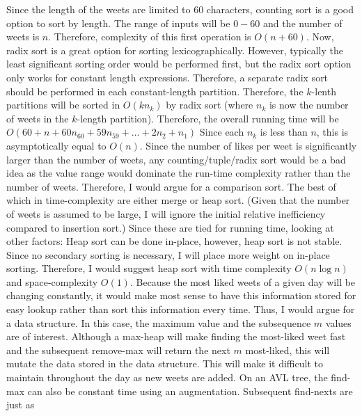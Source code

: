 \documentclass[12pt,twoside]{article}
\begin{document}
\begin{problems}
\newpage
\problem  %

\begin{problemparts}
\problempart Since the length of the weets are limited to 60 characters,
    counting sort is a good option to sort by length. The range of inputs
    will be $0 - 60$ and the number of weets is $n$. Therefore, complexity of
    this first operation is $O(n + 60)$. Now, radix sort is a great option
    for sorting lexicographically. However, typically the least significant
    sorting order would be performed first, but the radix sort option only
    works for constant length expressions. Therefore, a separate radix sort
    should be performed in each constant-length partition. Therefore, the
    $k$-lenth partitions will be sorted in $ O(kn_k) $ by radix sort (where
    $n_k$ is now the number of weets in the $k$-length partition). Therefore,
    the overall running time will be $ O(60 + n + 60n_{60} + 59 n_{59} +
    \ldots + 2 n_2 + n_1) $ Since each $n_k$ is less than $n$, this is
    asymptotically equal to $O(n)$.
\problempart Since the number of likes per weet is significantly larger than
    the number of weets, any counting/tuple/radix sort would be a bad idea as
    the value range would dominate the run-time complexity rather than the
    number of weets. Therefore, I would argue for a comparison sort. The best
    of which in time-complexity are either merge or heap sort. (Given that
    the number of weets is assumed to be large, I will ignore the initial
    relative inefficiency compared to insertion sort.) Since these are tied for
    running time, looking at other factors: Heap sort can be done in-place,
    however, heap sort is not stable. Since no secondary sorting is
    necessary, I will place more weight on in-place sorting. Therefore, I
    would suggest heap sort with time complexity $O(n \log n)$ and
    space-complexity $O(1)$.
\problempart Because the most liked weets of a given day will be changing
    constantly, it would make most sense to have this information stored for
    easy lookup rather than sort this information every time. Thus, I would
    argue for a data structure. In this case, the maximum value and the
    subsequence $m$ values are of interest. Although a max-heap will make
    finding the most-liked weet fast and the subsequent remove-max will
    return the next $m$ most-liked, this will mutate the data stored in the
    data structure. This will make it difficult to maintain throughout the
    day as new weets are added. On an AVL tree, the find-max can also be
    constant time using an augmentation. Subsequent find-nexts are just as

\end{problemparts}
\end{problems}
\end{document}
